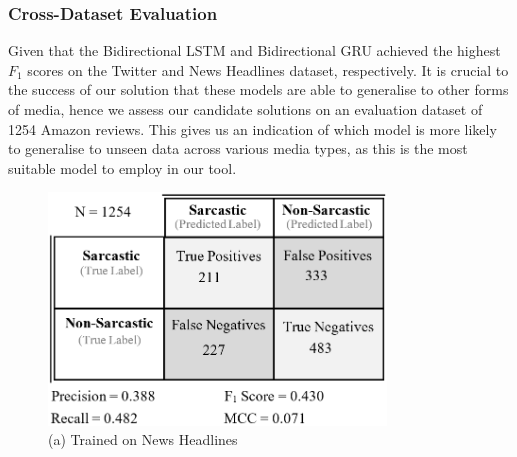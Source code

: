 \documentclass[12pt,a4paper]{article}
\begin{document}
\subsubsection{Cross-Dataset Evaluation}
Given that the Bidirectional LSTM and Bidirectional GRU achieved the highest $F_1$ scores on the Twitter and News Headlines dataset, respectively. It is crucial to the success of our solution that these models are able to generalise to other forms of media, hence we assess our candidate solutions on an evaluation dataset of 1254 Amazon reviews. This gives us an indication of which model is more likely to generalise to unseen data across various media types, as this is the most suitable model to employ in our tool.

\begin{minipage}{0.45\textwidth}
	\vspace{-5pt}\begin{figure}[H]
		\begin{center}
			\includegraphics[width=0.8\textwidth]{Images/cm2.png}\\
			(a) Trained on News Headlines\\
		\end{center}
	\end{figure}
\end{minipage}
\end{document}
